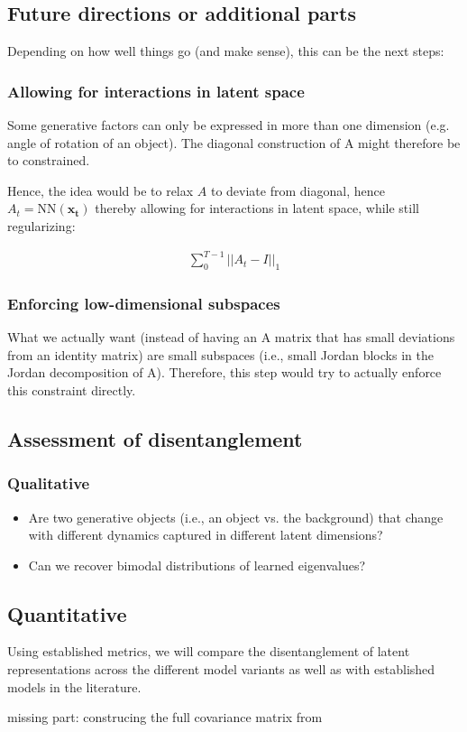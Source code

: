 \subsection{Future directions or additional parts}
Depending on how well things go (and make sense), this can be the next steps:
\subsubsection{Allowing for interactions in latent space}

Some generative factors can only be expressed in more than one dimension (e.g. angle of rotation of an object). The diagonal construction of A might therefore be to constrained.

Hence, the idea would be to relax $A$ to deviate from diagonal, hence $A_t = \text{NN}(\mathbf{x_t})$ thereby allowing for interactions in latent space, while still regularizing:

\begin{align*}
    \sum_0^{T-1} ||A_t - I||_1
\end{align*}

\subsubsection{Enforcing low-dimensional subspaces}

What we actually want (instead of having an A matrix that has small deviations from an identity matrix) are small subspaces (i.e., small Jordan blocks in the Jordan decomposition of A). Therefore, this step would try to actually enforce this constraint directly.

\subsection{Assessment of disentanglement}

\subsubsection{Qualitative}

\begin{itemize}
\item Are two generative objects (i.e., an object vs. the background) that change with different dynamics captured in different latent dimensions? 
\item Can we recover bimodal distributions of learned eigenvalues?
\end{itemize}

\subsection{Quantitative}

Using established metrics, we will compare the disentanglement of latent representations across the different model variants as well as with established models in the literature.

missing part: construcing the full covariance matrix from